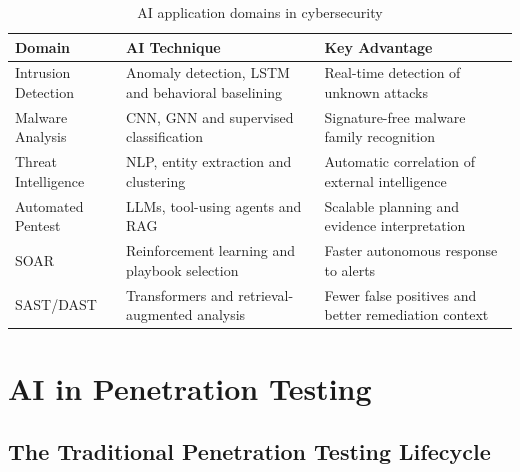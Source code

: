 \documentclass[12pt,a4paper]{report}
\begin{document}
\begin{table}[H]
    \centering
    \renewcommand{\arraystretch}{1.35}
    \begin{tabular}{|p{}|p{}|p{}|}
        \hline
        \textbf{Domain} & \textbf{AI Technique} & \textbf{Key Advantage} \\
        \hline
        Intrusion Detection & Anomaly detection, LSTM and behavioral baselining & Real-time detection of unknown attacks \\
        \hline
        Malware Analysis & CNN, GNN and supervised classification & Signature-free malware family recognition \\
        \hline
        Threat Intelligence & NLP, entity extraction and clustering & Automatic correlation of external intelligence \\
        \hline
        Automated Pentest & LLMs, tool-using agents and RAG & Scalable planning and evidence interpretation \\
        \hline
        SOAR & Reinforcement learning and playbook selection & Faster autonomous response to alerts \\
        \hline
        SAST/DAST & Transformers and retrieval-augmented analysis & Fewer false positives and better remediation context \\
        \hline
    \end{tabular}
    \caption{AI application domains in cybersecurity}
    \label{tab:ai_domains}
\end{table}

\section{AI in Penetration Testing}

\subsection{The Traditional Penetration Testing Lifecycle}
\end{document}
